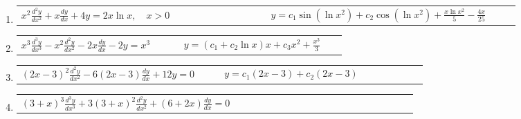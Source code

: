 \documentclass[a4paper,12pt]{article}
\begin{document}
\begin{enumerate}
    \item
    \begin{tabularx}{\linewidth}{L{0.45\linewidth} R{0.45\linewidth}}
    \( x^2 \frac{d^2 y}{dx^2} + x \frac{dy}{dx} + 4 y = 2 x \ln x, \quad x > 0 \) & \(\displaystyle y = c_1 \sin(\ln x^2) + c_2 \cos(\ln x^2) + \frac{x \ln x^2}{5} - \frac{4 x}{25} \)
    \end{tabularx}

    \item
    \begin{tabularx}{\linewidth}{L{0.45\linewidth} R{0.45\linewidth}}
    \( x^3 \frac{d^3 y}{dx^3} - x^2 \frac{d^2 y}{dx^2} - 2 x \frac{dy}{dx} - 2 y = x^3 \) & \(\displaystyle y = (c_1 + c_2 \ln x) x + c_3 x^2 + \frac{x^3}{3} \)
    \end{tabularx}

    \item
    \begin{tabularx}{\linewidth}{L{0.45\linewidth} R{0.45\linewidth}}
    \( (2 x - 3)^2 \frac{d^2 y}{dx^2} - 6 (2 x - 3) \frac{dy}{dx} + 12 y = 0 \) & \(\displaystyle y = c_1 (2 x - 3) + c_2 (2 x - 3) \)
    \end{tabularx}

    \item
    \begin{tabularx}{\linewidth}{L{0.55\linewidth} R{0.45\linewidth}}
    \( (3 + x)^3 \frac{d^3 y}{dx^3} + 3 (3 + x)^2 \frac{d^2 y}{dx^2} + (6 + 2 x) \frac{dy}{dx} = 0 \) 
    \end{tabularx}
\end{enumerate}
\end{document}
